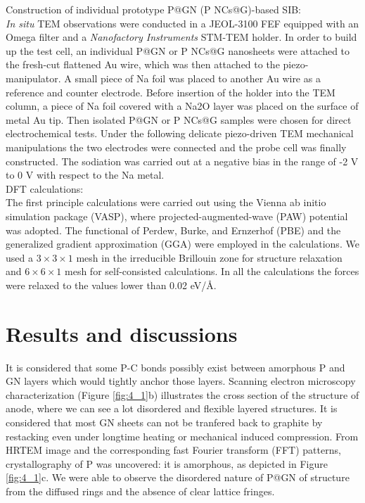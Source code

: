 Construction of individual prototype P@GN (P NCs@G)-based SIB: \\
\textit{In situ} TEM observations were conducted in a JEOL-3100 FEF equipped with an Omega filter and a {\em Nanofactory Instruments} STM-TEM holder. In order to build up the test cell, an individual P@GN or P NCs@G nanosheets were attached to the fresh-cut flattened Au wire, which was then attached to the piezo-manipulator. A small piece of Na foil was placed to another Au wire as a reference and counter electrode. Before insertion of the holder into the TEM column, a piece of Na foil covered with a Na2O layer was placed on the surface of metal Au tip. Then isolated P@GN or P NCs@G samples were chosen for direct electrochemical tests. Under the following delicate piezo-driven TEM mechanical manipulations the two electrodes were connected and the probe cell was finally constructed. The sodiation was carried out at a negative bias in the range of -2 V to 0 V with respect to the Na metal.\\

DFT calculations:\\
The first principle calculations were carried out using the Vienna ab initio simulation package (VASP),\cite{Kresse1996} where projected-augmented-wave (PAW) potential was adopted.\cite{Kresse1999} The functional of Perdew, Burke, and Ernzerhof (PBE) and the generalized gradient approximation (GGA)\cite{Perdew1996} were employed in the calculations. We used a $3\times3\times1$ mesh in the irreducible Brillouin zone for structure relaxation and $6\times6\times1$ mesh for self-consisted calculations. In all the calculations the forces were relaxed to the values lower than 0.02 eV/Å.

\section{Results and discussions}


It is considered that some P-C bonds possibly exist between amorphous P and GN layers which would tightly anchor those layers. Scanning electron microscopy characterization (Figure \ref{fig:4_1}b) illustrates the cross section of the structure of anode, where we can see a lot disordered and flexible layered structures. It is considered that most GN sheets can not be tranfered back to graphite by restacking even under longtime heating or mechanical induced compression.\cite{Huang2015b} From HRTEM image and the corresponding fast Fourier transform (FFT) patterns, crystallography of P was uncovered: it is amorphous, as depicted in Figure \ref{fig:4_1}c. We were able to observe the disordered nature of P@GN of structure from the diffused rings and the absence of clear lattice fringes. 

